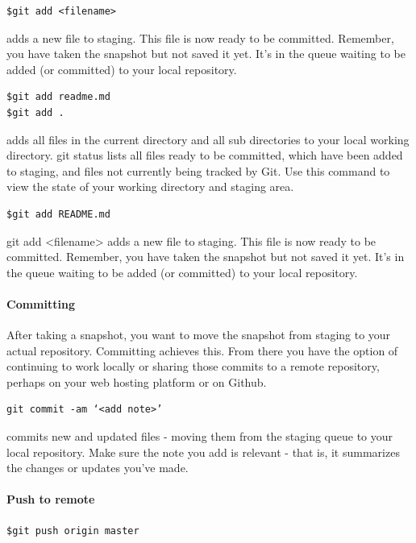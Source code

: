 \begin{verbatim}
$git add <filename> 
\end{verbatim}
adds a new file to staging. This file is now ready to be committed. Remember, you have taken the snapshot but not saved it yet. It’s in the queue waiting to be added (or committed) to your local repository.
\begin{verbatim}
$git add readme.md
$git add . 
\end{verbatim}

adds all files in the current directory and all sub directories to your local working directory.
git status lists all files ready to be committed, which have been added to staging, and files not currently being tracked by Git. Use this command to view the state of your working directory and staging area.

\begin{verbatim}
$git add README.md
\end{verbatim}
git add <filename> adds a new file to staging. This file is now ready to be committed. 
Remember, you have taken the snapshot but not saved it yet. It’s in the queue waiting
to be added (or committed) to your local repository.

\paragraph*{Committing}

After taking a snapshot, you want to move the snapshot from staging to your actual repository. Committing achieves this. From there you have the option of continuing to work locally or sharing those commits to a remote repository, perhaps on your web hosting platform or on Github.

\begin{verbatim}
git commit -am ‘<add note>’ 
\end{verbatim}

commits new and updated files - moving them from the staging queue to your local repository. Make sure the note you add is relevant - that is, it summarizes the changes or updates you’ve made.

\paragraph*{Push to remote}

\begin{verbatim}
$git push origin master 
\end{verbatim}

